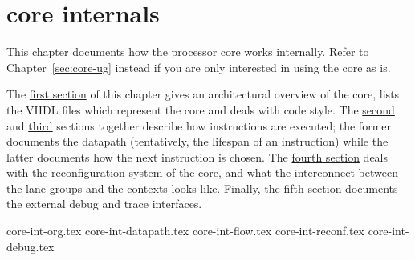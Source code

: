 \chapter{\rvex{} core internals}
\label{sec:core-int}

This chapter documents how the \rvex{} processor core works internally. Refer to
Chapter~\ref{sec:core-ug} instead if you are only interested in using the core
as is.

The \hyperref[sec:core-int-org]{first section} of this chapter gives an 
architectural overview of the core, lists the VHDL files which represent the 
core and deals with code style. The \hyperref[sec:core-int-datapath]{second} and 
\hyperref[sec:core-int-flow]{third} sections together describe how instructions 
are executed; the former documents the datapath (tentatively, the lifespan of an 
instruction) while the latter documents how the next instruction is chosen. The 
\hyperref[sec:core-int-reconf]{fourth section} deals with the reconfiguration 
system of the core, and what the interconnect between the lane groups and the 
contexts looks like. Finally, the \hyperref[sec:core-int-debug]{fifth section} 
documents the external debug and trace interfaces.

{core-int-org.tex}
{core-int-datapath.tex}
{core-int-flow.tex}
{core-int-reconf.tex}
{core-int-debug.tex}
